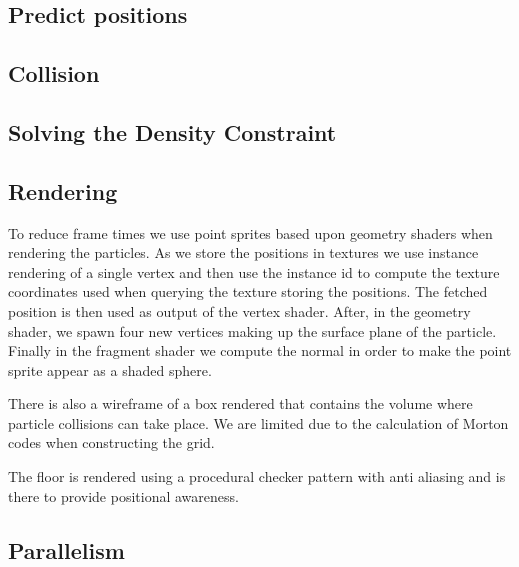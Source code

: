 

\subsection{Predict positions}


\subsection{Collision}


\subsection{Solving the Density Constraint}


\subsection{Rendering}
To reduce frame times we use point sprites based upon geometry shaders when rendering the particles. As we store the positions in textures we use instance rendering of a single vertex and then use the instance id to compute the texture coordinates used when querying the texture storing the positions. The fetched position is then used as output of the vertex shader. After, in the geometry shader, we spawn four new vertices making up the surface plane of the particle. Finally in the fragment shader we compute the normal in order to make the point sprite appear as a shaded sphere.

There is also a wireframe of a box rendered that contains the volume where particle collisions can take place. We are limited due to the calculation of Morton codes when constructing the grid. 

The floor is rendered using a procedural checker pattern with anti aliasing and is there to provide positional awareness.


\subsection{Parallelism}

